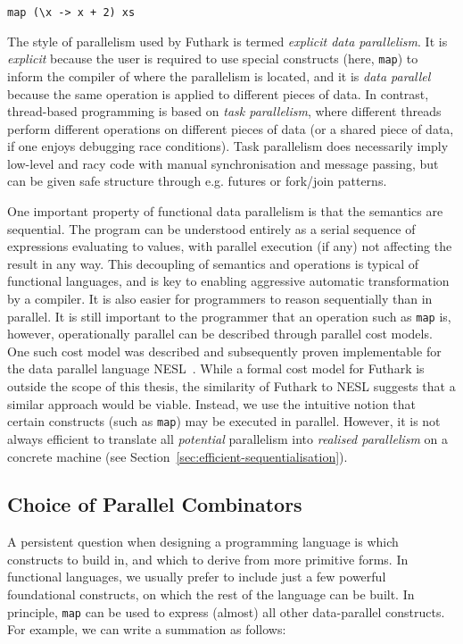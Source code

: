 \begin{lstlisting}
map (\x -> x + 2) xs
\end{lstlisting}

The style of parallelism used by Futhark is termed \textit{explicit
  data parallelism}.  It is \textit{explicit} because the user is
required to use special constructs (here, \lstinline{map}) to inform
the compiler of where the parallelism is located, and it is
\textit{data parallel} because the same operation is applied to
different pieces of data.  In contrast, thread-based programming is
based on \textit{task parallelism}, where different threads perform
different operations on different pieces of data (or a shared piece of
data, if one enjoys debugging race conditions).  Task parallelism does
necessarily imply low-level and racy code with manual synchronisation
and message passing, but can be given safe structure through
e.g. futures or fork/join patterns.

One important property of functional data parallelism is that the
semantics are sequential.  The program can be understood entirely as a
serial sequence of expressions evaluating to values, with parallel
execution (if any) not affecting the result in any way.  This
decoupling of semantics and operations is typical of functional
languages, and is key to enabling aggressive automatic transformation
by a compiler.  It is also easier for programmers to reason
sequentially than in parallel.  It is still important to the
programmer that an operation such as \lstinline{map} is, however,
operationally parallel can be described through parallel cost models.
One such cost model was described and subsequently proven
implementable for the data parallel language
NESL~\cite{Blelloch:1996:PTS:232627.232650}.  While a formal cost
model for Futhark is outside the scope of this thesis, the similarity
of Futhark to NESL suggests that a similar approach would be viable.
Instead, we use the intuitive notion that certain constructs (such as
\lstinline{map}) may be executed in parallel.  However, it is not
always efficient to translate all \textit{potential} parallelism into
\textit{realised parallelism} on a concrete machine (see
Section~\ref{sec:efficient-sequentialisation}).

\subsection{Choice of Parallel Combinators}

A persistent question when designing a programming language is which
constructs to build in, and which to derive from more primitive forms.
In functional languages, we usually prefer to include just a few
powerful foundational constructs, on which the rest of the language
can be built.  In principle, \lstinline{map} can be used to express
(almost) all other data-parallel constructs.  For example, we can
write a summation as follows:

